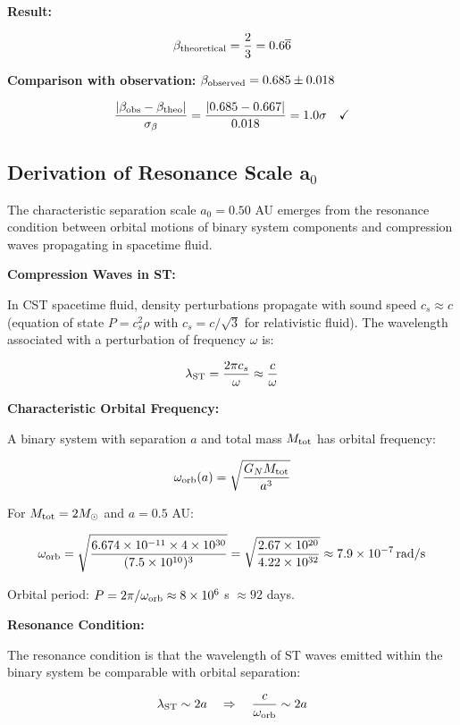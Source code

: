 \documentclass[10pt,a4paper]{article}
\begin{document}
\textbf{Result:}

\[\beta_{\rm theoretical} = \frac{2}{3} = 0.6\overline{6}\]

\textbf{Comparison with observation:}
\(\beta_{\rm observed} = 0.685 \pm 0.018\)

\[\frac{|\beta_{\rm obs} - \beta_{\rm theo}|}{\sigma_\beta} = \frac{|0.685 - 0.667|}{0.018} = 1.0\sigma \quad \checkmark\]

\subsection*{Derivation of Resonance Scale
a$_{0}$}\label{a.2-derivation-of-resonance-scale-aux2080}

The characteristic separation scale \(a_0 = 0.50\) AU emerges from the
resonance condition between orbital motions of binary system components
and compression waves propagating in spacetime fluid.

\textbf{Compression Waves in ST:}

In CST spacetime fluid, density perturbations propagate with sound speed
\(c_s \approx c\) (equation of state \(P = c_s^2\rho\) with
\(c_s = c/\sqrt{3}\) for relativistic fluid). The wavelength associated
with a perturbation of frequency \(\omega\) is:

\[\lambda_{\rm ST} = \frac{2\pi c_s}{\omega} \approx \frac{c}{\omega}\]

\textbf{Characteristic Orbital Frequency:}

A binary system with separation \(a\) and total mass \(M_{\rm tot}\) has
orbital frequency:

\[\omega_{\rm orb}(a) = \sqrt{\frac{G_N M_{\rm tot}}{a^3}}\]

For \(M_{\rm tot} = 2 M_\odot\) and \(a = 0.5\) AU:

\[\omega_{\rm orb} = \sqrt{\frac{6.674\times10^{-11} \times 4\times10^{30}}{(7.5\times10^{10})^3}} = \sqrt{\frac{2.67\times10^{20}}{4.22\times10^{32}}} \approx 7.9\times10^{-7}\,\mathrm{rad/s}\]

Orbital period: \(P = 2\pi/\omega_{\rm orb} \approx 8\times10^6\) s
\(\approx 92\) days.

\textbf{Resonance Condition:}

The resonance condition is that the wavelength of ST waves emitted
within the binary system be comparable with orbital separation:

\[\lambda_{\rm ST} \sim 2a \quad \Rightarrow \quad \frac{c}{\omega_{\rm orb}} \sim 2a\]
\end{document}
